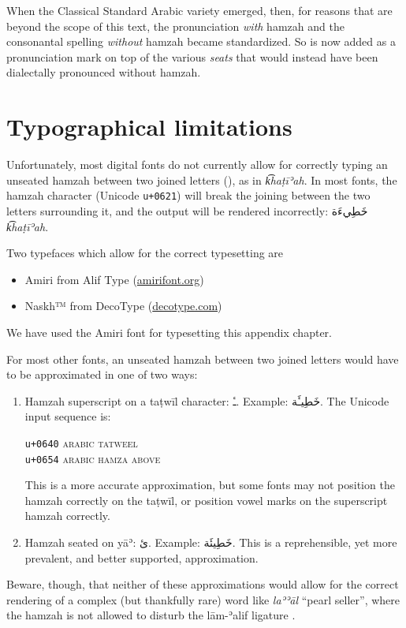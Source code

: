 \documentclass[
  10pt,
]{book}
\providecommand{\tightlist}{%
  \setlength{\itemsep}{0pt}\setlength{\parskip}{0pt}}
\begin{document}
When the Classical Standard Arabic variety emerged,
then, for reasons that are beyond the scope of this text,
the pronunciation \emph{with} hamzah
and the consonantal spelling \emph{without} hamzah became standardized.
So {} is now added as a pronunciation mark on top of the various \emph{seats} that would instead have been dialectally pronounced without hamzah.

\section{Typographical limitations}\label{typographical-limitations}

Unfortunately, most digital fonts do not currently allow for correctly typing an unseated hamzah between two joined letters
({}),
as in
{} \emph{k͡haṭīʾah}.
In most fonts, the hamzah character (Unicode {\texttt{u+0621}}) will break the joining between the two letters surrounding it, and the output will be rendered incorrectly:
\foreignlanguage{arabic}{خَطِيءَة} \emph{k͡haṭīʾah}.

Two typefaces which allow for the correct typesetting are

\begin{itemize}
\tightlist
\item
  Amiri from Alif Type (\href{https://www.amirifont.org/}{amirifont.org})
\item
  Naskh™ from DecoType (\href{https://www.decotype.com/}{decotype.com})
\end{itemize}

We have used the Amiri font for typesetting this appendix chapter.

For most other fonts,
an unseated hamzah between two joined letters
would have to be approximated
in one of two ways:

\begin{enumerate}
\def\labelenumi{\arabic{enumi}.}
\item
  Hamzah superscript on a taṭwīl character: \foreignlanguage{arabic}{ـٔ}. Example: \foreignlanguage{arabic}{خَطِيـَٔة}. The Unicode input sequence is:

  {\texttt{u+0640}} \textsc{arabic tatweel}\\
  {\texttt{u+0654}} \textsc{arabic hamza above}

  This is a more accurate approximation, but some fonts may not position the hamzah correctly on the taṭwīl, or position vowel marks on the superscript hamzah correctly.
\item
  Hamzah seated on yāʾ: \foreignlanguage{arabic}{ئ}. Example: \foreignlanguage{arabic}{خَطِيئَة}. This is a reprehensible, yet more prevalent, and better supported, approximation.
\end{enumerate}

Beware, though, that neither of these approximations would allow for the correct rendering of a complex (but thankfully rare) word like
{} \emph{laʾʾāl} \enquote{pearl seller}, where the hamzah is not allowed to disturb the lām-ʾalif ligature {}.
\end{document}
